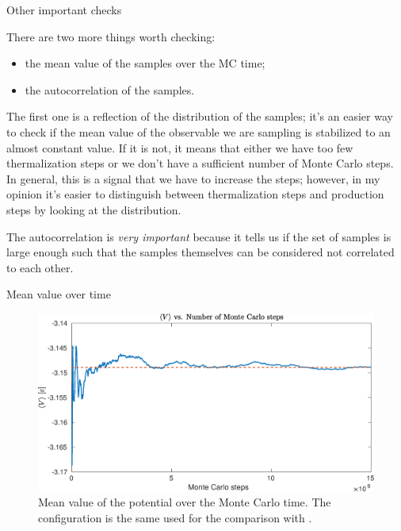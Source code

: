 \documentclass[10pt, compress, protectframetitle, handout]{beamer}
\begin{document}
\begin{frame}{Other important checks}

	There are two more things worth checking:
	\begin{itemize}
		\item the \alert{mean value} of the samples over the MC time;
		\item the \alert{autocorrelation} of the samples.
	\end{itemize}
	
	The first one is a reflection of the distribution of the samples; it's an easier way to check if the mean value of the observable we are sampling is stabilized to an almost constant value. If it is not, it means that either we have too few thermalization steps or we don't have a sufficient number of Monte Carlo steps. In general, this is a signal that we have to increase the steps; however, in my opinion it's easier to distinguish between thermalization steps and production steps by looking at the distribution.
	
	The autocorrelation is \emph{very important} because it tells us if the set of samples is large enough such that the samples themselves can be considered not correlated to each other. 

\end{frame}

\begin{frame}{Mean value over time}
	\begin{figure}
		\centering
		\includegraphics[width=\textwidth]{meanvalue_example}
		\caption{Mean value of the potential over the Monte Carlo time. The configuration is the same used for the comparison with \cite{Johnson1993}.}
		\label{fig:meanvalue_example}
	\end{figure}
\end{frame}
\end{document}

